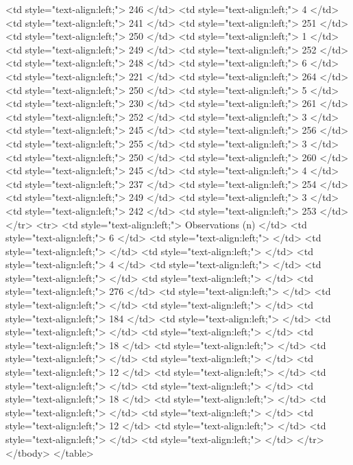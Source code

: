    <td style="text-align:left;"> 246 </td>
   <td style="text-align:left;"> 4 </td>
   <td style="text-align:left;"> 241 </td>
   <td style="text-align:left;"> 251 </td>
   <td style="text-align:left;"> 250 </td>
   <td style="text-align:left;"> 1 </td>
   <td style="text-align:left;"> 249 </td>
   <td style="text-align:left;"> 252 </td>
   <td style="text-align:left;"> 248 </td>
   <td style="text-align:left;"> 6 </td>
   <td style="text-align:left;"> 221 </td>
   <td style="text-align:left;"> 264 </td>
   <td style="text-align:left;"> 250 </td>
   <td style="text-align:left;"> 5 </td>
   <td style="text-align:left;"> 230 </td>
   <td style="text-align:left;"> 261 </td>
   <td style="text-align:left;"> 252 </td>
   <td style="text-align:left;"> 3 </td>
   <td style="text-align:left;"> 245 </td>
   <td style="text-align:left;"> 256 </td>
   <td style="text-align:left;"> 255 </td>
   <td style="text-align:left;"> 3 </td>
   <td style="text-align:left;"> 250 </td>
   <td style="text-align:left;"> 260 </td>
   <td style="text-align:left;"> 245 </td>
   <td style="text-align:left;"> 4 </td>
   <td style="text-align:left;"> 237 </td>
   <td style="text-align:left;"> 254 </td>
   <td style="text-align:left;"> 249 </td>
   <td style="text-align:left;"> 3 </td>
   <td style="text-align:left;"> 242 </td>
   <td style="text-align:left;"> 253 </td>
  </tr>
  <tr>
   <td style="text-align:left;"> Observations (n) </td>
   <td style="text-align:left;"> 6 </td>
   <td style="text-align:left;">  </td>
   <td style="text-align:left;">  </td>
   <td style="text-align:left;">  </td>
   <td style="text-align:left;"> 4 </td>
   <td style="text-align:left;">  </td>
   <td style="text-align:left;">  </td>
   <td style="text-align:left;">  </td>
   <td style="text-align:left;"> 276 </td>
   <td style="text-align:left;">  </td>
   <td style="text-align:left;">  </td>
   <td style="text-align:left;">  </td>
   <td style="text-align:left;"> 184 </td>
   <td style="text-align:left;">  </td>
   <td style="text-align:left;">  </td>
   <td style="text-align:left;">  </td>
   <td style="text-align:left;"> 18 </td>
   <td style="text-align:left;">  </td>
   <td style="text-align:left;">  </td>
   <td style="text-align:left;">  </td>
   <td style="text-align:left;"> 12 </td>
   <td style="text-align:left;">  </td>
   <td style="text-align:left;">  </td>
   <td style="text-align:left;">  </td>
   <td style="text-align:left;"> 18 </td>
   <td style="text-align:left;">  </td>
   <td style="text-align:left;">  </td>
   <td style="text-align:left;">  </td>
   <td style="text-align:left;"> 12 </td>
   <td style="text-align:left;">  </td>
   <td style="text-align:left;">  </td>
   <td style="text-align:left;">  </td>
  </tr>
</tbody>
</table>
